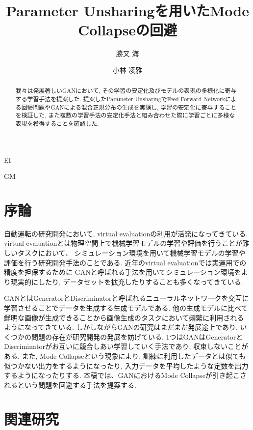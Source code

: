 \documentclass[techrep, submit, noauthor,preface]{ipsj}
\begin{document}
\title{Parameter Unsharingを用いたMode Collapseの回避}


\author{勝又 海}{}{EI}
\author{小林 凌雅}{}{GM}

\maketitle
\thispagestyle{empty} 
\begin{abstract}

  我々は発展著しいGANにおいて, その学習の安定化及びモデルの表現の多様化に寄与する学習手法を提案した.
  提案したParameter UnsharingでFeed Forward Networkによる回帰問題やGANによる混合正規分布の生成を実験し,
  学習の安定化に寄与することを検証した,
  また複数の学習手法の安定化手法と組み合わせた際に学習ごとに多様な表現を獲得することを確認した.

\end{abstract}

\section{序論}

自動運転の研究開発において, virtual evaluationの利用が活発になってきている.
virtual evaluationとは物理空間上で機械学習モデルの学習や評価を行うことが難しいタスクにおいて、
シミュレーション環境を用いて機械学習モデルの学習や評価を行う研究開発手法のことである.
近年のvirtual evaluationでは実運用での精度を担保するために
GANと呼ばれる手法を用いてシミュレーション環境をより現実的にしたり, 
データセットを拡充したりすることも多くなってきている.

GANとはGeneratorとDiscriminatorと呼ばれるニューラルネットワークを交互に学習させることでデータを生成する生成モデルである\cite{gan}. 他の生成モデルに比べて鮮明な画像が生成できることから画像生成のタスクにおいて頻繁に利用される
ようになってきている.
しかしながらGANの研究はまだまだ発展途上であり, いくつかの問題の存在が研究開発の発展を妨げている\cite{tutorial}.
1つはGANはGeneratorとDiscriminatorがお互いに競合しあい学習していく手法であり, 収束しないことがある.
また, Mode Collapseという現象により, 訓練に利用したデータとは似ても似つかない出力をするようになったり,
入力データを平均したような定数を出力するようになったりする.
本稿では、GANにおけるMode Collapseが引き起こされるという問題を回避する手法を提案する.

\section{関連研究}
\end{document}
